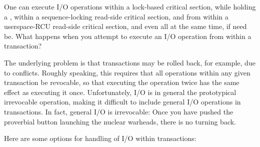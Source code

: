One can execute I/O operations within a lock-based critical section,
while holding a , within a sequence-locking read-side
critical section, and from within a userspace-RCU read-side critical
section, and even all at the same time, if need be.
What happens when you attempt to execute an I/O operation from within
a transaction?

The underlying problem is that transactions may be rolled back, for
example, due to conflicts.
Roughly speaking, this requires that all operations within any given
transaction be revocable, so that executing the operation twice has
the same effect as executing it once.
Unfortunately, I/O is in general the prototypical irrevocable
operation, making it difficult to include general I/O operations in
transactions.
In fact, general I/O is irrevocable:
Once you have pushed the proverbial button launching the nuclear warheads,
there is no turning back.

Here are some options for handling of I/O within transactions:

